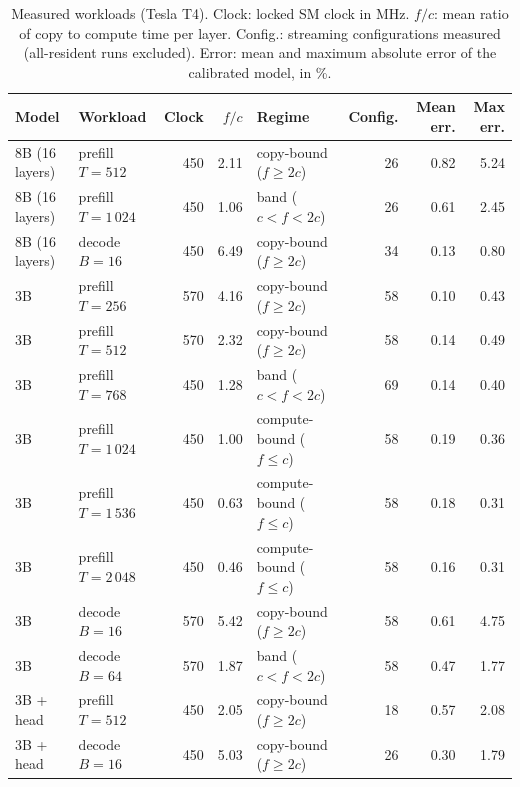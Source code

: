 \begin{table}[t]
\centering
\caption{Measured workloads (Tesla T4). Clock: locked SM clock in MHz. $f/c$: mean ratio of copy to compute time per layer. Config.: streaming configurations measured (all-resident runs excluded). Error: mean and maximum absolute error of the calibrated model, in \%.}
\label{tab:workloads}
\small
\begin{tabular}{llrrlrrr}
\toprule
Model & Workload & Clock & $f/c$ & Regime & Config. & Mean err. & Max err.\\
\midrule
8B (16 layers) & prefill $T=512$ & 450 & 2.11 & copy-bound ($f\ge 2c$) & 26 & 0.82 & 5.24\\
8B (16 layers) & prefill $T=1\,024$ & 450 & 1.06 & band ($c<f<2c$) & 26 & 0.61 & 2.45\\
8B (16 layers) & decode $B=16$ & 450 & 6.49 & copy-bound ($f\ge 2c$) & 34 & 0.13 & 0.80\\
3B & prefill $T=256$ & 570 & 4.16 & copy-bound ($f\ge 2c$) & 58 & 0.10 & 0.43\\
3B & prefill $T=512$ & 570 & 2.32 & copy-bound ($f\ge 2c$) & 58 & 0.14 & 0.49\\
3B & prefill $T=768$ & 450 & 1.28 & band ($c<f<2c$) & 69 & 0.14 & 0.40\\
3B & prefill $T=1\,024$ & 450 & 1.00 & compute-bound ($f\le c$) & 58 & 0.19 & 0.36\\
3B & prefill $T=1\,536$ & 450 & 0.63 & compute-bound ($f\le c$) & 58 & 0.18 & 0.31\\
3B & prefill $T=2\,048$ & 450 & 0.46 & compute-bound ($f\le c$) & 58 & 0.16 & 0.31\\
3B & decode $B=16$ & 570 & 5.42 & copy-bound ($f\ge 2c$) & 58 & 0.61 & 4.75\\
3B & decode $B=64$ & 570 & 1.87 & band ($c<f<2c$) & 58 & 0.47 & 1.77\\
3B + head & prefill $T=512$ & 450 & 2.05 & copy-bound ($f\ge 2c$) & 18 & 0.57 & 2.08\\
3B + head & decode $B=16$ & 450 & 5.03 & copy-bound ($f\ge 2c$) & 26 & 0.30 & 1.79\\
\bottomrule
\end{tabular}
\end{table}
